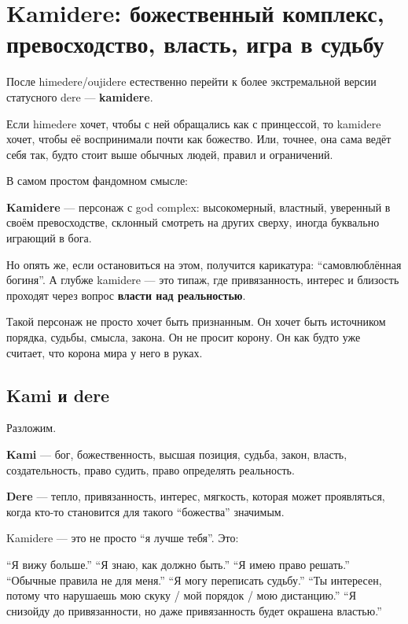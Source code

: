 \section{Kamidere: божественный комплекс, превосходство, власть, игра в судьбу}

После himedere/\hspace{0pt}oujidere естественно перейти к более экстремальной версии
статусного dere --- \textbf{kamidere}.

Если himedere хочет, чтобы с ней обращались как с принцессой, то
kamidere хочет, чтобы её воспринимали почти как божество. Или, точнее,
она сама ведёт себя так, будто стоит выше обычных людей, правил и
ограничений.

В самом простом фандомном смысле:

\textbf{Kamidere} --- персонаж с god complex: высокомерный, властный,
уверенный в своём превосходстве, склонный смотреть на других сверху,
иногда буквально играющий в бога.

Но опять же, если остановиться на этом, получится карикатура:
``самовлюблённая богиня''. А глубже kamidere --- это типаж, где
привязанность, интерес и близость проходят через вопрос \textbf{власти
над реальностью}.

Такой персонаж не просто хочет быть признанным. Он хочет быть источником
порядка, судьбы, смысла, закона. Он не просит корону. Он как будто уже
считает, что корона мира у него в руках.

\subsection*{Kami и dere}

Разложим.

\textbf{Kami} --- бог, божественность, высшая позиция, судьба, закон,
власть, создательность, право судить, право определять реальность.

\textbf{Dere} --- тепло, привязанность, интерес, мягкость, которая может
проявляться, когда кто-то становится для такого ``божества'' значимым.

Kamidere --- это не просто ``я лучше тебя''. Это:

``Я вижу больше.'' ``Я знаю, как должно быть.'' ``Я имею право решать.''
``Обычные правила не для меня.'' ``Я могу переписать судьбу.'' ``Ты
интересен, потому что нарушаешь мою скуку /\hspace{0pt} мой порядок /\hspace{0pt} мою
дистанцию.'' ``Я снизойду до привязанности, но даже привязанность будет
окрашена властью.''

